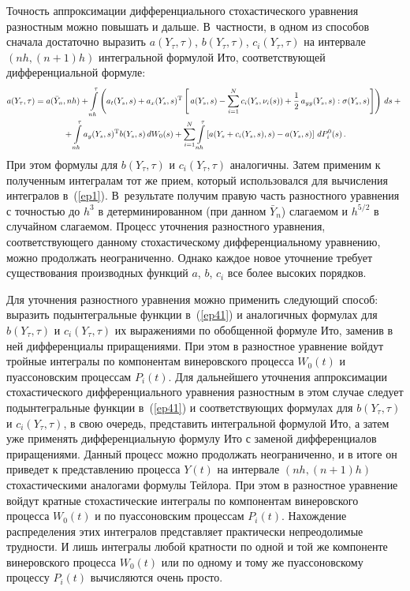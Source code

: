{Точность аппроксимации дифференциального стохастического уравнения
разностным можно  повышать и дальше. В~частности, в одном из способов сначала
достаточно выразить $a(Y_{\tau},\tau)$,
$b(Y_{\tau},\tau)$, $c_i(Y_{\tau},\tau)$ на интервале $(nh,(n+1)h)$
интегральной формулой Ито, соответствующей дифференциальной формуле:
    \begin{multline}
    a(Y_{\tau},\tau)=a(\bar Y_n,nh)+\int\limits_{nh}^{\tau}\left( a_t(Y_s,s)+
    a_x(Y_s,s)^{\mathrm{T}}\left[\,a(Y_s,s)-\sum_{i=1}^N c_i(Y_s,\nu_i(s))+\displaystyle\frac{\displaystyle 1\mathstrut}{\displaystyle 2\mathstrut}\,a_{yy}(Y_s,s):
    \sigma(Y_s,s)\right]\right)\,ds+{}\\
    {}+\int\limits_{nh}^{\tau}a_y(Y_s,s)^{\mathrm{T}}
 b(Y_s,s)\,dW_0(s)+\sum_{i=1}^N \int\limits_{nh}^{\tau}
    \left[a(Y_s+c_i(Y_s,s),s)-a(Y_s,s)\right]\,dP_i^0(s)\,. \label{ep41}
    \end{multline}
При этом формулы для $b(Y_{\tau},\tau)$ и $c_i(Y_{\tau},\tau)$ аналогичны. Затем
применим к полученным интегралам тот же прием, который использовался
для вычисления интегралов в~(\ref{ep1}). В~результате получим правую
часть разностного уравнения с точностью до $h^3$ в детерминированном
(при данном $\bar Y_n$) слагаемом и $h^{5/2}$ в случайном слагаемом.
Процесс уточнения разностного уравнения, соответствующего данному
стохастическому дифференциальному уравнению, можно продолжать
неограниченно. Однако каждое новое уточнение требует существования
производных функций $a$, $b$, $c_i$ все более высоких порядков.

Для уточнения разностного уравнения можно применить следующий способ: выразить подынтегральные функции в~(\ref{ep41}) и
аналогичных формулах для $b(Y_{\tau},\tau)$ и $c_i(Y_{\tau},\tau)$ их
выражениями по обобщенной формуле Ито, заменив в ней дифференциалы
приращениями. При этом в разностное уравнение войдут тройные интегралы
по компонентам винеровского процесса $W_0(t)$ и пуассоновским процессам
$P_i(t)$. Для дальнейшего уточнения аппроксимации стохастического
дифференциального уравнения разностным в этом случае следует
подынтегральные функции в~(\ref{ep41}) и соответствующих формулах для
$b(Y_{\tau},\tau)$ и $c_i(Y_{\tau},\tau)$, в свою очередь,
представить интегральной формулой Ито, а затем уже применять
дифференциальную формулу Ито с заменой дифференциалов приращениями.
Данный процесс можно продолжать неограниченно, и в итоге он приведет к
представлению процесса $Y(t)$ на интервале $(nh,(n+1)h)$
стохастическими аналогами формулы Тейлора. При этом в разностное
уравнение войдут кратные стохастические интегралы по компонентам
винеровского процесса $W_0(t)$ и по пуассоновским процессам $P_i(t)$.
Нахождение распределения этих интегралов представляет практически
непреодолимые трудности. И лишь интегралы любой кратности по одной и
той же компоненте винеровского процесса $W_0(t)$ или по одному и тому же
пуассоновскому процессу $P_i(t)$ вычисляются очень просто.

}
